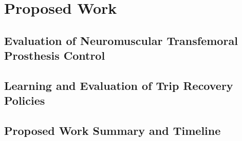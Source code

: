 \chapter{Proposed Work}

\section{Evaluation of Neuromuscular Transfemoral Prosthesis Control}

\section{Learning and Evaluation of Trip Recovery Policies}

\section{Proposed Work Summary and Timeline}
